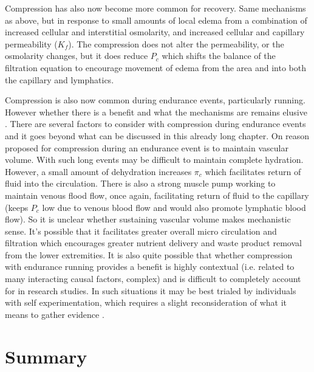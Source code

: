 Compression has also now become more common for recovery. Same mechanisms as above, but in response to small amounts of local edema from a combination of increased cellular and interstitial osmolarity, and increased cellular and capillary permeability ($K_f$). The compression does not alter the permeability, or the osmolarity changes, but it does reduce $P_c$ which shifts the balance of the filtration equation to encourage movement of edema from the area and into both the capillary and lymphatics.

Compression is also now common during endurance events, particularly running. However whether there is a benefit and what the mechanisms are remains elusive \cite{mota_effects_2020}. There are several factors to consider with compression during endurance events and it goes beyond what can be discussed in this already long chapter. On reason proposed for compression during an endurance event is to maintain vascular volume. With such long events may be difficult to maintain complete hydration. However, a small amount of dehydration increases $\pi_c$ which facilitates return of fluid into the circulation. There is also a strong muscle pump working to maintain venous flood flow, once again, facilitating return of fluid to the capillary (keeps $P_c$ low due to venous blood flow and would also promote lymphatic blood flow). So it is unclear whether sustaining vascular volume makes mechanistic sense. It's possible that it facilitates greater overall micro circulation and filtration which encourages greater nutrient delivery and waste product removal from the lower extremities. It is also quite possible that whether compression with endurance running provides a benefit is highly contextual (i.e. related to many interacting causal factors, complex) and is difficult to completely account for in research studies. In such situations it may be best trialed by individuals with self experimentation, which requires a slight reconsideration of what it means to gather evidence \cite{anjum2020rethinking}.

\section{Summary}

